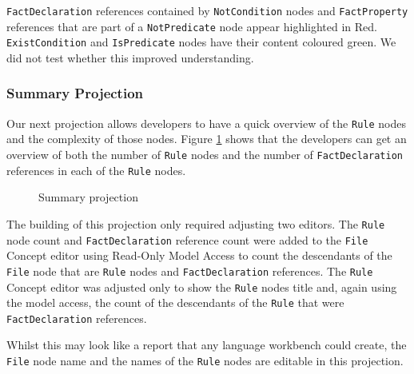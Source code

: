 \texttt{FactDeclaration} references contained by \texttt{NotCondition} nodes and \texttt{FactProperty} references that are part of a \texttt{NotPredicate} node appear highlighted in Red.
\texttt{ExistCondition} and \texttt{IsPredicate} nodes have their content coloured green.
We did not test whether this improved understanding.

\subsubsection{Summary Projection}

Our next projection allows developers to have a quick overview of the \texttt{Rule} nodes and the complexity of those nodes.
Figure \ref{fig:summaryProjection} shows that the developers can get an overview of both the number of \texttt{Rule} nodes and the number of \texttt{FactDeclaration} references in each of the \texttt{Rule} nodes.

\begin{figure}
    \centering
    \caption{Summary projection}
    \label{fig:summaryProjection}
\end{figure}

The building of this projection only required adjusting two editors.
The \texttt{Rule} node count and \texttt{FactDeclaration} reference count were added to the \texttt{File} Concept editor using Read-Only Model Access to count the descendants of the \texttt{File} node that are \texttt{Rule} nodes and \texttt{FactDeclaration} references.
The \texttt{Rule} Concept editor was adjusted only to show the \texttt{Rule} nodes title and, again using the model access, the count of the descendants of the \texttt{Rule} that were \texttt{FactDeclaration} references.

Whilst this may look like a report that any language workbench could create, the \texttt{File} node name and the names of the \texttt{Rule} nodes are editable in this projection.

